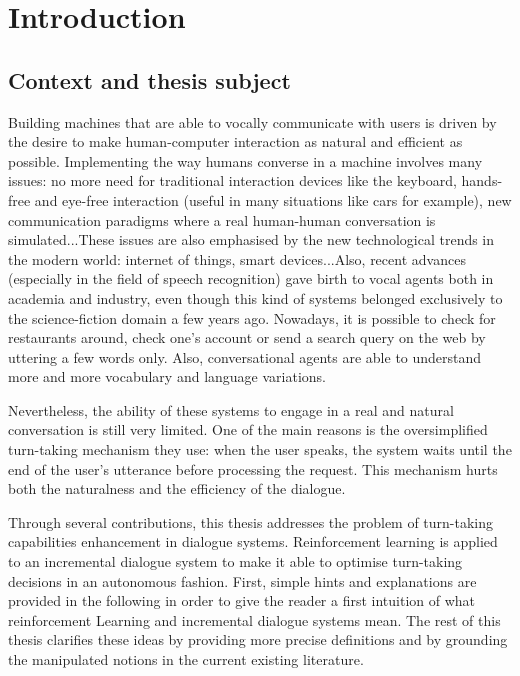 \chapter*{Introduction}

\section*{Context and thesis subject}

				Building machines that are able to vocally communicate with users is driven by the desire to make human-computer interaction as natural and efficient as possible. Implementing the way humans converse in a machine involves many issues: no more need for traditional interaction devices like the keyboard, hands-free and eye-free interaction (useful in many situations like cars for example), new communication paradigms where a real human-human conversation is simulated...These issues are also emphasised by the new technological trends in the modern world: internet of things, smart devices...Also, recent advances (especially in the field of speech recognition) gave birth to vocal agents both in academia and industry, even though this kind of systems belonged exclusively to the science-fiction domain a few years ago. Nowadays, it is possible to check for restaurants around, check one's account or send a search query on the web by uttering a few words only. Also, conversational agents are able to understand more and more vocabulary and language variations.
				
				Nevertheless, the ability of these systems to engage in a real and natural conversation is still very limited. One of the main reasons is the oversimplified turn-taking mechanism they use: when the user speaks, the system waits until the end of the user's utterance before processing the request. This mechanism hurts both the naturalness and the efficiency of the dialogue.
				
				Through several contributions, this thesis addresses the problem of turn-taking capabilities enhancement in dialogue systems. Reinforcement learning is applied to an incremental dialogue system to make it able to optimise turn-taking decisions in an autonomous fashion. First, simple hints and explanations are provided in the following in order to give the reader a first intuition of what reinforcement Learning and incremental dialogue systems mean. The rest of this thesis clarifies these ideas by providing more precise definitions and by grounding the manipulated notions in the current existing literature.

